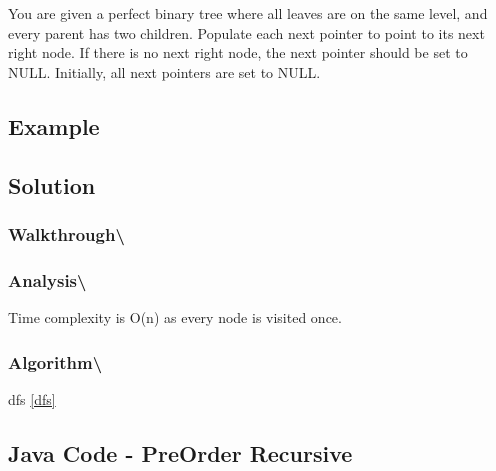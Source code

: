 \documentclass[]{book}
\begin{document}
You are given a perfect binary tree where all leaves are on the same level, and every parent has two children.
Populate each next pointer to point to its next right node. If there is no next right node, the next pointer should
be set to NULL. Initially, all next pointers are set to NULL.

\hypertarget{example-75}{%
\subsection{Example}\label{example-75}}

\hypertarget{solution-55}{%
\subsection{Solution}\label{solution-55}}

\hypertarget{walkthrough-89}{%
\subsubsection{Walkthrough\textbackslash{}}\label{walkthrough-89}}

\hypertarget{analysis-96}{%
\subsubsection{Analysis\textbackslash{}}\label{analysis-96}}

Time complexity is O(n) as every node is visited once.

\hypertarget{algorithm-98}{%
\subsubsection{Algorithm\textbackslash{}}\label{algorithm-98}}

dfs \ref{dfs}

\hypertarget{java-code---preorder-recursive}{%
\subsection{Java Code - PreOrder Recursive}\label{java-code---preorder-recursive}}
\end{document}
